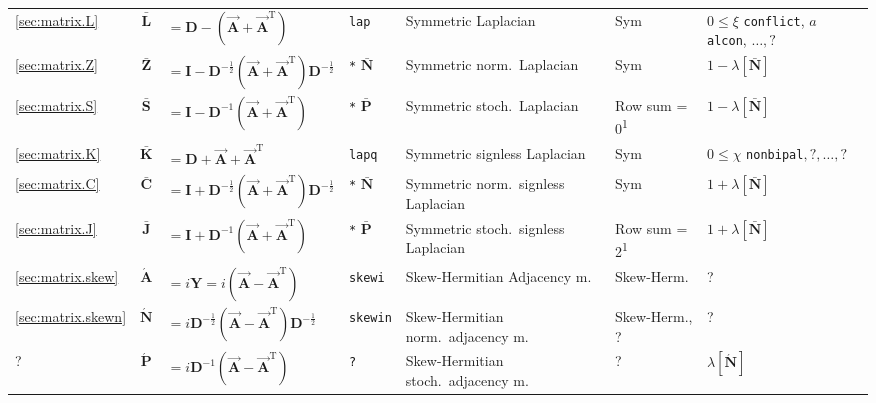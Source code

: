 \documentclass{article}
\begin{document}
\begin{table}
{{\begin{tabular}{ l c@{\;}l l l l l }
    \midrule

    \ref{sec:matrix.L} & $\mathbf{\bar L}$&$ = \mathbf D - (\vec{\mathbf A}+\vec{\mathbf A}^{\mathrm T})$ & \texttt{lap} & Symmetric Laplacian &
    Sym 		& $0\leq \xi$ \texttt{conflict}, $a$ \texttt{alcon}, $\ldots, ?$ \\ 
    \ref{sec:matrix.Z} & $\mathbf{\bar Z}$&$ = \mathbf I - \mathbf D^{-\frac 12}(\vec{\mathbf A}+\vec{\mathbf A}^{\mathrm T})\mathbf D^{-\frac 12}$ & \texttt{*} $\mathbf{\bar N}$ & Symmetric norm.\ Laplacian &
    Sym 		& $1-\lambda[\mathbf{\bar N}]$ \\
    \ref{sec:matrix.S} & $\mathbf{\bar S}$&$ = \mathbf I - \mathbf D^{-1}(\vec{\mathbf A}+\vec{\mathbf A}^{\mathrm T})$ & \texttt{*} $\mathbf{\bar P}$ & Symmetric stoch.\ Laplacian &
    Row sum = 0\textsuperscript{1}    	& $1-\lambda[\mathbf{\bar N}]$ \\

    \midrule

    \ref{sec:matrix.K} & $\mathbf{\bar K}$&$ = \mathbf D + \vec{\mathbf A}+\vec{\mathbf A}^{\mathrm T}$ & \texttt{lapq} & Symmetric signless Laplacian &
    Sym      		& $0\leq \chi$ \texttt{nonbipal}$, ?, \ldots, ?$ \\
    \ref{sec:matrix.C} & $\mathbf{\bar C}$&$ = \mathbf I + \mathbf D^{-\frac 12}(\vec{\mathbf A}+\vec{\mathbf A}^{\mathrm T})\mathbf D^{-\frac 12}$ & \texttt{*} $\mathbf{\bar N}$ & Symmetric norm.\ signless Laplacian &
    Sym 		& $1+\lambda[\mathbf{\bar N}]$ \\
    \ref{sec:matrix.J} & $\mathbf{\bar J}$&$ = \mathbf I + \mathbf D^{-1}(\vec{\mathbf A}+\vec{\mathbf A}^{\mathrm T})$ & \texttt{*} $\mathbf{\bar P}$ & Symmetric stoch.\ signless Laplacian &
    Row sum = 2\textsuperscript{1} & $1+\lambda[\mathbf{\bar N}]$ \\

    \midrule \midrule
    
    \ref{sec:matrix.skew} & $\mathbf{\acute A}$&$=i\mathbf Y=i(\vec{\mathbf A}-\vec{\mathbf A}^{\mathrm T})$& \texttt{skewi} & Skew-Hermitian Adjacency m. &
    Skew-Herm. 		& ? \\
    \ref{sec:matrix.skewn} & $\mathbf{\acute N}$&$=i\mathbf D^{-\frac 12}(\vec{\mathbf A}-\vec{\mathbf A}^{\mathrm T})\mathbf D^{-\frac 12}$ & \texttt{skewin} & Skew-Hermitian norm.\ adjacency m. &
    Skew-Herm., ? 		& ?  \\
    ? & $\mathbf{\acute P}$&$ = i\mathbf D^{-1}(\vec{\mathbf A}-\vec{\mathbf A}^{\mathrm T})$ & \texttt{?} & Skew-Hermitian stoch.\ adjacency m. &
    ? 	& $\lambda[\mathbf{\acute N}]$ \\


\end{tabular}}}
\end{table}
\end{document}
